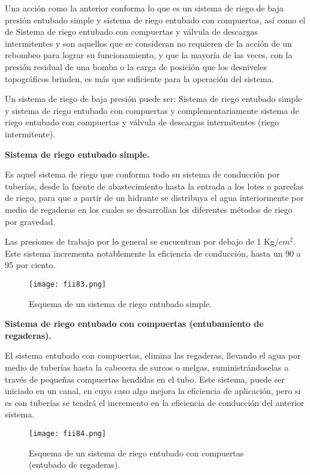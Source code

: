 Una acción como la anterior conforma lo que es un sistema de riego de baja
presión entubado simple y sistema de riego entubado con compuertas, así como el de
Sistema de riego entubado con compuertas y válvula de descargas intermitentes y son
aquellos que se consideran no requieren de la acción de un rebombeo para lograr su
funcionamiento, y que la mayoría de las veces, con la presión residual de una bomba o
la carga de posición que los desniveles topográficos brinden, es más que suficiente
para la operación del sistema.

Un sistema de riego de baja presión puede ser: Sistema de riego entubado
simple y sistema de riego entubado con compuertas y complementariamente sistema de
riego entubado con compuertas y válvula de descargas intermitentes (riego intermitente).

\textbf{Sistema de riego entubado simple.}

Es aquel sistema de riego que conforma todo su sistema de conducción por
tuberías, desde la fuente de abastecimiento hasta la entrada a los lotes o parcelas de
riego, para que a partir de un hidrante se distribuya el agua interiormente por medio de
regaderas en los cuales se desarrollan los diferentes métodos de riego por gravedad.

Las presiones de trabajo por lo general se encuentran por debajo de 1 Kg/$cm^2$. Este
sistema incrementa notablemente la eficiencia de conducción, hasta un 90 a 95 por
ciento.

\begin{figure}[h!]
	\centerline{\texttt{[image: fii83.png]}}
	\caption{Esquema de un sistema de riego entubado simple.}
	\label{fii83}
\end{figure}

\textbf{Sistema de riego entubado con compuertas (entubamiento de regaderas).}

El sistema entubado con compuertas, elimina las regaderas, llevando el agua por
medio de tuberías hasta la cabecera de surcos o melgas, suministrándoselas a través
de pequeñas compuertas hendidas en el tubo. Este sistema, puede ser iniciado en un
canal, en cuyo caso algo mejora la eficiencia de aplicación, pero si es con tuberías se
tendrá el incremento en la eficiencia de conducción del anterior sistema.

\begin{figure}[h!]
	\centerline{\texttt{[image: fii84.png]}}
	\caption{Esquema de un sistema de riego entubado con compuertas (entubado de regaderas).}
	\label{fii84}
\end{figure}

